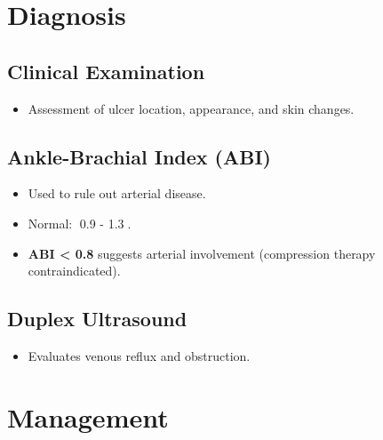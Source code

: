 \documentclass{article}
\begin{document}
\section{Diagnosis}
\subsection{Clinical Examination}
\begin{itemize}
    \item Assessment of ulcer location, appearance, and skin changes.
\end{itemize}

\subsection{Ankle-Brachial Index (ABI)}
\begin{itemize}
    \item Used to rule out arterial disease.
    \item Normal: 0.9 - 1.3.
    \item \textbf{ABI < 0.8} suggests arterial involvement (compression therapy contraindicated).
\end{itemize}

\subsection{Duplex Ultrasound}
\begin{itemize}
    \item Evaluates venous reflux and obstruction.
\end{itemize}

\section{Management}
\end{document}
